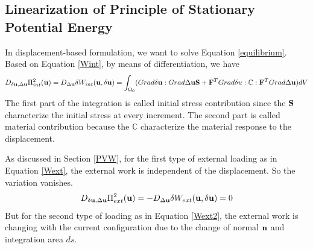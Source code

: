 %
\subsection{Linearization of Principle of Stationary Potential Energy}
In displacement-based formulation, we want to solve Equation \ref{equilibrium}. Based on Equation \ref{Wint}, by means of differentiation, we have
\begin{equation} \label{Kint}
D_{\delta\bold{u}, \Delta\bold{u}}\Pi_{int}^2(\bold{u}) = D_{\Delta{\bold{u}}}\delta{W_{int}}(\bold{u}, \delta{\bold{u}}) = \int_{\Omega_0}(Grad\delta\bold{u} : Grad\Delta\bold{u}\bold{S} + \bold{F}^TGrad\delta{u} : \mathbb{C} : \bold{F}^T Grad\Delta\bold{u})dV
\end{equation}
The first part of the integration is called initial stress contribution since the $\bold{S}$ characterize the initial stress at every increment. The second part is called material contribution because the $\mathbb{C}$ characterize the material response to the displacement.

As discussed in Section \ref{PVW}, for the first type of external loading as in  Equation \ref{Wext}, the external work is independent of the displacement. So the variation vanishes.
\begin{equation} \label{Kext}
D_{\delta\bold{u}, \Delta\bold{u}}\Pi_{ext}^2(\bold{u}) = - D_{\Delta{\bold{u}}}\delta{W_{ext}}(\bold{u}, \delta{\bold{u}}) = 0
\end{equation}
But for the second type of loading as in Equation \ref{Wext2}, the external work is changing with the current configuration due to the change of normal $\bold{n}$ and integration area $ds$. 

